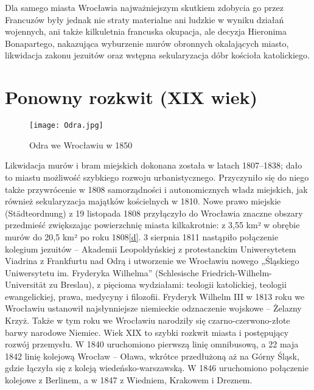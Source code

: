 \documentclass{article}
\begin{document}
Dla samego miasta Wrocławia najważniejszym skutkiem zdobycia go przez Francuzów były jednak nie straty materialne ani ludzkie w wyniku działań wojennych, ani także kilkuletnia francuska okupacja, ale decyzja Hieronima Bonapartego, nakazująca wyburzenie murów obronnych okalających miasto, likwidacja zakonu jezuitów oraz wstępna sekularyzacja dóbr kościoła katolickiego.

\section{Ponowny rozkwit (XIX wiek)}

\begin{wrapfigure}{r}{0.42\textwidth} 
\begin{center}
\vspace{-20pt}
\texttt{[image: Odra.jpg]}
\end{center}
\vspace{-20pt}
\caption{Odra we Wrocławiu w 1850}
\vspace{-10pt}
\end{wrapfigure}

Likwidacja murów i bram miejskich dokonana została w latach 1807–1838; dało to miastu możliwość szybkiego rozwoju urbanistycznego. Przyczyniło się do niego także przywrócenie w 1808 samorządności i autonomicznych władz miejskich, jak również sekularyzacja majątków kościelnych w 1810. Nowe prawo miejskie (Städteordnung) z 19 listopada 1808 przyłączyło do Wrocławia znaczne obszary przedmieść zwiększając powierzchnię miasta kilkakrotnie: z 3,55 km² w obrębie murów do 20,5 km² po roku 1808\hyperref[d]{[d]}. 3 sierpnia 1811 nastąpiło połączenie kolegium jezuitów – Akademii Leopoldyńskiej z protestanckim Uniwersytetem Viadrina z Frankfurtu nad Odrą i utworzenie we Wrocławiu nowego „Śląskiego Uniwersytetu im. Fryderyka Wilhelma” (Schlesische Friedrich-Wilhelm-Universität zu Breslau), z pięcioma wydziałami: teologii katolickiej, teologii ewangelickiej, prawa, medycyny i filozofii. Fryderyk Wilhelm III w 1813 roku we Wrocławiu ustanowił najsłynniejsze niemieckie odznaczenie wojskowe – Żelazny Krzyż. Także w tym roku we Wrocławiu narodziły się czarno-czerwono-złote barwy narodowe Niemiec. Wiek XIX to szybki rozkwit miasta i postępujący rozwój przemysłu. W 1840 uruchomiono pierwszą linię omnibusową, a 22 maja 1842 linię kolejową Wrocław – Oława, wkrótce przedłużoną aż na Górny Śląsk, gdzie łączyła się z koleją wiedeńsko-warszawską. W 1846 uruchomiono połączenie kolejowe z Berlinem, a w 1847 z Wiedniem, Krakowem i Dreznem.
\end{document}
